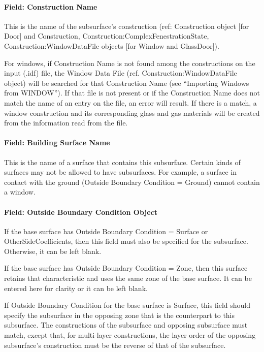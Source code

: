 \paragraph{Field: Construction Name}\label{field-construction-name-20}

This is the name of the subsurface's construction (ref: Construction object {[}for Door{]} and Construction, Construction:ComplexFenestrationState, Construction:WindowDataFile objects {[}for Window and GlassDoor{]}).

For windows, if Construction Name is not found among the constructions on the input (.idf) file, the Window Data File (ref. Construction:WindowDataFile object) will be searched for that Construction Name (see ``Importing Windows from WINDOW''). If that file is not present or if the Construction Name does not match the name of an entry on the file, an error will result. If there is a match, a window construction and its corresponding glass and gas materials will be created from the information read from the file.

\paragraph{Field: Building Surface Name}\label{field-building-surface-name-6}

This is the name of a surface that contains this subsurface. Certain kinds of surfaces may not be allowed to have subsurfaces. For example, a surface in contact with the ground (Outside Boundary Condition = Ground) cannot contain a window.

\paragraph{Field: Outside Boundary Condition Object}\label{field-outside-boundary-condition-object-10}

If the base surface has Outside Boundary Condition = Surface or OtherSideCoefficients, then this field must also be specified for the subsurface. Otherwise, it can be left blank.

If the base surface has Outside Boundary Condition = Zone, then this surface retains that characteristic and uses the same zone of the base surface. It can be entered here for clarity or it can be left blank.

If Outside Boundary Condition for the base surface is Surface, this field should specify the subsurface in the opposing zone that is the counterpart to this subsurface. The constructions of the subsurface and opposing subsurface must match, except that, for multi-layer constructions, the layer order of the opposing subsurface's construction must be the reverse of that of the subsurface.

